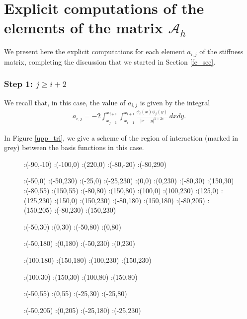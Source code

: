 {\appendix

\section{Explicit computations of the elements of the matrix $\mathcal A_h$}\label{appendix}

We present here the explicit computations for each element $a_{i,j}$ of the stiffness matrix, completing the discussion that we started in Section \ref{fe_sec}.

\subsubsection*{Step 1: $j\geq i+2$}
We recall that, in this case, the value of $a_{i,j}$ is given by the integral
\begin{align}\label{elem_noint_app}
	a_{i,j}=-2 \int_{x_{j-1}}^{x_{j+1}}\int_{x_{i-1}}^{x_{i+1}}\frac{\phi_i(x)\phi_j(y)}{|x-y|^{1+2s}}\,dxdy.
\end{align}

In Figure \ref{upp_tri}, we give a scheme of the region of interaction (marked in grey) between the basis functions in this case. 
\begin{figure}[h]
\figinit{0.8pt}
:(-90,-10)
:(-100,0) :(220,0)
:(-80,-20) :(-80,290)

:(-50,0) :(-50,230)
:(-25,0) :(-25,230)
:(0,0) :(0,230)
%
:(-80,30) :(150,30)
:(-80,55) :(150,55)
:(-80,80) :(150,80)
%
:(100,0) :(100,230)
:(125,0) :(125,230)
:(150,0) :(150,230)
%
:(-80,180) :(150,180)
:(-80,205) :(150,205)
:(-80,230) :(150,230)

:(-50,30) :(0,30)
:(-50,80) :(0,80)

:(-50,180) :(0,180)
:(-50,230) :(0,230)

:(100,180) :(150,180)
:(100,230) :(150,230)

:(100,30) :(150,30)
:(100,80) :(150,80)

:(-50,55) :(0,55)
:(-25,30) :(-25,80)

:(-50,205) :(0,205)
:(-25,180) :(-25,230)


\end{figure}}
